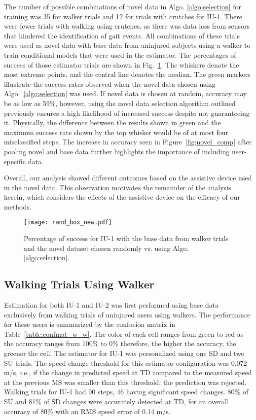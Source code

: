 The number of possible combinations of novel data in Algo. \ref{algo:selection} for training was 35 for walker trials and 12 for trials with crutches for IU-1. There were fewer trials with walking using crutches, as there was data loss from sensors that hindered the identification of gait events. All combinations of these trials were used as novel data with base data from uninjured subjects using a walker to train conditional models that were used in the estimator. The percentages of success of those estimator trials are shown in Fig.~\ref{fig:rand_box}. The whiskers denote the most extreme points, and the central line denotes the median. The green markers illustrate the success rates observed when the novel data chosen using Algo.~\ref{algo:selection} was used. If novel data is chosen at random, accuracy may be as low as 59\%, however, using the novel data selection algorithm outlined previously ensures a high likelihood of increased success despite not guaranteeing it. Physically, the difference between the results shown in green and the maximum success rate shown by the top whisker would be of at most four misclassified steps. The increase in accuracy seen in Figure~\ref{fig:novel_comp} after pooling novel and base data further highlights the importance of including user-specific data.

Overall, our analysis showed different outcomes based on the assistive device used in the novel data. This observation motivates the remainder of the analysis herein, which considers the effects of the assistive device on the efficacy of our methods. 

\begin{figure}
	\centering
	\texttt{[image: rand\_box\_new.pdf]}
	\caption{Percentage of success for IU-1 with the base data from walker trials and the novel dataset chosen randomly vs. using Algo. \ref{algo:selection}.}\label{fig:rand_box}
\end{figure}

\subsection{Walking Trials Using Walker}\label{subsec:ww}
Estimation for both IU-1 and IU-2 was first performed using base data exclusively from walking trials of uninjured users using walkers. The performance for these users is summarized by the confusion matrix in Table~\ref{table:confmat_w_w}. The color of each cell ranges from green to red as the accuracy ranges from 100\% to 0\% therefore, the higher the accuracy, the greener the cell.  The estimator for IU-1 was personalized using one SD and two SU trials. The speed change threshold for this estimator configuration was 0.072 m/s, i.e., if the change in predicted speed at TD compared to the measured speed at the previous MS was smaller than this threshold, the prediction was rejected. Walking trials for IU-1 had 90 steps, 46 having significant speed changes. 80\% of SU and 81\% of SD changes were accurately detected at TD, for an overall accuracy of 80\% with an RMS speed error of 0.14 m/s.

